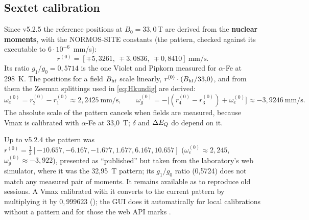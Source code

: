 \subsection{Sextet calibration}\label{ap:calib}
Since v5.2.5 the reference positions at $B_0=33{,}0\,$T are derived from the
\textbf{nuclear moments}, with the NORMOS-SITE constants (the  pattern,
checked against its executable to $6\cdot10^{-6}$~mm/s):
\begin{equation}
  r^{(0)} = [\mp5{,}3261,\ \mp3{,}0836,\ \mp0{,}8410]\ \text{mm/s}.
\end{equation}
Its ratio $g_1/g_0=0{,}5714$ is the one Violet and Pipkorn measured for $\alpha$-Fe
at 298~K. The positions for a field $B_{\mathrm{hf}}$ scale linearly, $r^{(0)}\cdot(B_{\mathrm{hf}}/33{,}0)$,
and from them the Zeeman splittings used in \eqref{eq:Hkundig} are derived:
\begin{equation}
  \omega_e^{(0)} = r^{(0)}_2-r^{(0)}_1 \approx 2{,}2425\ \text{mm/s},\qquad
  \omega_g^{(0)} = -\bigl[(r^{(0)}_4-r^{(0)}_3)+\omega_e^{(0)}\bigr] \approx -3{,}9246\ \text{mm/s}.
\end{equation}
The absolute scale of the pattern cancels when fields are measured, because Vmax is
calibrated with $\alpha$-Fe at 33{,}0~T; $\delta$ and $\Delta E_{Q}$ do depend on it.
\begin{nota}
Up to v5.2.4 the pattern was $r^{(0)}=\tfrac12[-10.657,-6.167,-1.677,1.677,6.167,10.657]$
($\omega_e^{(0)}\approx2{,}245$, $\omega_g^{(0)}\approx-3{,}922$), presented as
``published'' but taken from the laboratory's web simulator, where it was the
32{,}95~T pattern; its $g_1/g_0$ ratio (0{,}5724) does not match any measured pair of
moments. It remains available as  to reproduce old sessions. A Vmax
calibrated with it converts to the current pattern by multiplying it by $0{,}999623$
(); the GUI does it automatically for local
calibrations without a pattern and for those the web API marks .
\end{nota}

